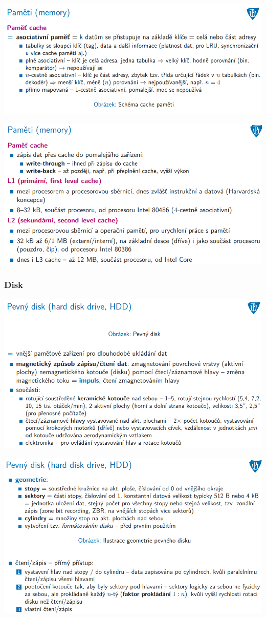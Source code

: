 \documentclass[10pt,a4paper]{article}
\begin{document}
\includegraphics[scale=0.65]{img/prvni_odstavec/otazka6/pamet9.png}

\includegraphics[scale=0.65]{img/prvni_odstavec/otazka6/pamet10.png}

\subsubsection{Disk}
\includegraphics[scale=0.65]{img/prvni_odstavec/otazka6/disk1.png}

\includegraphics[scale=0.65]{img/prvni_odstavec/otazka6/disk2.png}
\end{document}
